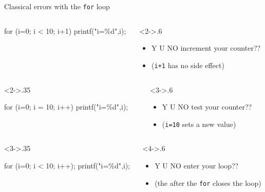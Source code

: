 \begin{frame}{Classical errors with the \texttt{for} loop}
  \begin{columns}
    \begin{column}{.35\linewidth}
      \begin{boitecode}{}
for (i=0; i < 10; \alert<2>{i+1})
   printf("i=\%d\n",i);
      \end{boitecode}
    \end{column}

    \begin{column}<2->{.6\linewidth}
      \begin{itemize}\vspace{-1.3\baselineskip}
      \item Y U NO increment your counter??
      \item[] (\texttt{i+1} has no side effect)
      \end{itemize}
    \end{column}
  \end{columns}

  \begin{columns}
    \begin{column}<2->{.35\linewidth}
      \begin{boitecode}{}
for (i=0; \alert<3>{i = 10}; i++) 
   printf("i=\%d\n",i);
      \end{boitecode}
    \end{column}

    \begin{column}<3->{.6\linewidth}
      \begin{itemize}\vspace{-1.3\baselineskip}
      \item Y U NO test your counter??
      \item[] (\texttt{i=10} sets a new value)
      \end{itemize}
    \end{column}
  \end{columns} 

  \begin{columns}
    \begin{column}<3->{.35\linewidth}
      \begin{boitecode}{}
for (i=0; i < 10; i++)\alert<4>{;}
   printf("i=\%d\n",i);
      \end{boitecode}
    \end{column}

    \begin{column}<4->{.6\linewidth}
      \begin{itemize}\vspace{-1.3\baselineskip}
      \item Y U NO enter your loop??
      \item[] (the \framebox{;} after the \texttt{for} closes the loop)
      \end{itemize}
    \end{column}
  \end{columns}


\end{frame}

